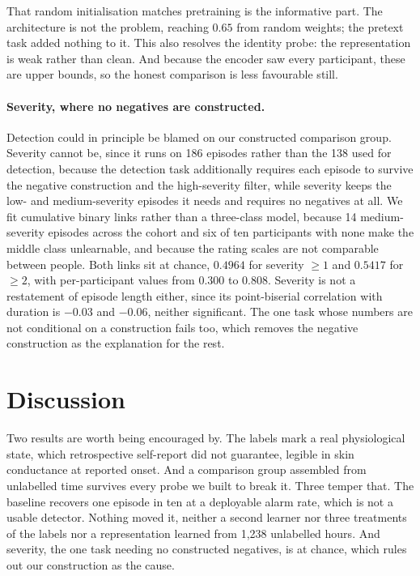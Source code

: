 \documentclass{article}
\begin{document}
That random initialisation matches pretraining is the informative part. The
architecture is not the problem, reaching $0.65$ from random weights; the
pretext task added nothing to it. This also resolves the identity probe: the
representation is weak rather than clean. And because the encoder saw every
participant, these are upper bounds, so the honest comparison is less
favourable still.

\paragraph{Severity, where no negatives are constructed.} Detection could in
principle be blamed on our constructed comparison group. Severity cannot be, since it
runs on 186 episodes rather than the 138 used for detection, because the
detection task additionally requires each episode to survive the negative
construction and the high-severity filter, while severity keeps the low- and
medium-severity episodes it needs and requires no negatives at all. We fit cumulative binary links rather than a three-class model, because 14
medium-severity episodes across the cohort and six of ten participants with
none make the middle class unlearnable, and because the rating scales are not
comparable between people. Both links sit at chance, $0.4964$ for severity
$\geq 1$ and $0.5417$ for $\geq 2$, with per-participant values from $0.300$ to
$0.808$. Severity is not a restatement of episode length either, since its
point-biserial correlation with duration is $-0.03$ and $-0.06$, neither
significant. The one task whose numbers are not conditional on a
construction fails too, which removes the negative construction as the
explanation for the rest.

\section{Discussion}

Two results are worth being encouraged by. The labels mark a real
physiological state, which retrospective self-report did not guarantee,
legible in skin conductance at reported onset. And a comparison group
assembled from unlabelled time survives every probe we built to break it. Three temper that. The baseline
recovers one episode in ten at a deployable alarm rate, which is not a usable
detector. Nothing moved it, neither a second learner nor three treatments of
the labels nor a representation learned from 1{,}238 unlabelled hours. And
severity, the one task needing no constructed negatives, is at chance, which
rules out our construction as the cause.
\end{document}
